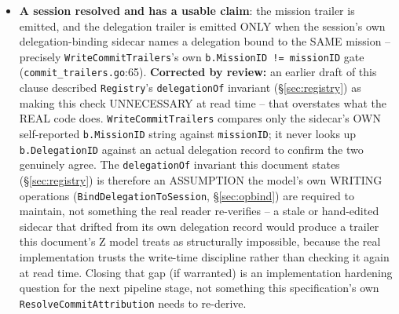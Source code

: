 \documentclass[a4paper,10pt,fleqn]{article}
\newcommand{\fpath}[1]{\texttt{#1}}
\newcommand{\field}[1]{\texttt{#1}}
\begin{document}
\begin{itemize}
    returned by the time this check runs, so a stale candidate is not a
    FAILURE OF RESOLUTION in the sense \field{FailClosedOnAmbiguity}
    targets (an ambiguous or broken pointer \field{resolve.SessionID}
    itself could not resolve); it is a successfully-resolved pointer to
    a session \field{Registry} itself now considers unusable. Both
    sub-cases -- dead/stale and never-claimed -- converge on the
    identical observable fact the real \field{WriteCommitTrailers}
    checks for: no USABLE mission claim exists for this candidate right
    now, for whatever reason. A reader wanting to DISTINGUISH ``stale''
    from ``never claimed'' at the trailer-writing layer would need
    \field{WriteCommitTrailers} itself to read \field{Registry}'s
    epoch/liveness state directly, which the real function does not do
    (it reads only the active-mission sidecar's own presence/content);
    adding that distinction here would claim a diagnostic capability
    the real implementation does not have.
  \item \textbf{A session resolved and has a usable claim}: the mission
    trailer is emitted, and the delegation trailer is emitted ONLY when
    the session's own delegation-binding sidecar names a delegation
    bound to the SAME mission -- precisely
    \field{WriteCommitTrailers}'s own
    \field{b.MissionID != missionID} gate
    (\fpath{commit\_trailers.go}:65). \textbf{Corrected by review:} an
    earlier draft of this clause described \field{Registry}'s
    \field{delegationOf} invariant (\S\ref{sec:registry}) as making
    this check UNNECESSARY at read time -- that overstates what the
    REAL code does. \field{WriteCommitTrailers} compares only the
    sidecar's OWN self-reported \field{b.MissionID} string against
    \field{missionID}; it never looks up \field{b.DelegationID} against
    an actual delegation record to confirm the two genuinely agree. The
    \field{delegationOf} invariant this document states
    (\S\ref{sec:registry}) is therefore an ASSUMPTION the model's own
    WRITING operations (\field{BindDelegationToSession},
    \S\ref{sec:opbind}) are required to maintain, not something the
    real reader re-verifies -- a stale or hand-edited sidecar that
    drifted from its own delegation record would produce a trailer this
    document's Z model treats as structurally impossible, because the
    real implementation trusts the write-time discipline rather than
    checking it again at read time. Closing that gap (if warranted) is
    an implementation hardening question for the next pipeline stage,
    not something this specification's own \field{ResolveCommitAttribution}
    needs to re-derive.
\end{itemize}
\end{document}
